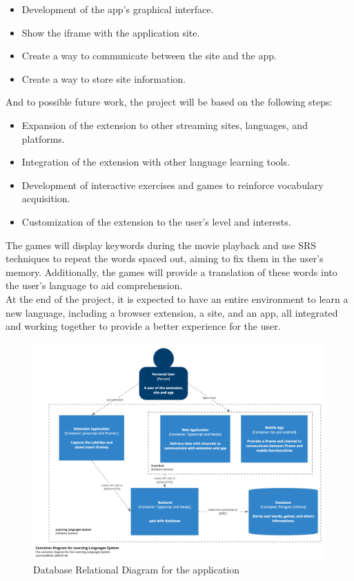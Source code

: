 \documentclass[12pt]{article}
\begin{document}
\begin{itemize}
\item Development of the app's graphical interface.
\item Show the iframe with the application site.
\item Create a way to communicate between the site and the app.
\item Create a way to store site information.
\end{itemize}
And to possible future work, the project will be based on the following steps:
\begin{itemize}
\item Expansion of the extension to other streaming sites, languages, and platforms.
\item Integration of the extension with other language learning tools.
\item Development of interactive exercises and games to reinforce vocabulary acquisition.
\item Customization of the extension to the user's level and interests.
\end{itemize}
The games will display keywords during the movie playback and use SRS techniques to repeat the words spaced out, aiming to fix them in the user's memory. Additionally, the games will provide a translation of these words into the user's language to aid comprehension. \\
At the end of the project, it is expected to have an entire environment to learn a new language, including a browser extension, a site, and an app, all integrated and working together to provide a better experience for the user. \\

\begin{figure}[h]
  \centering
  \caption{
  Database Relational Diagram for the application
  }
  \label{fig:container_diagram}
  \includegraphics[width=1\textwidth]{assets/24.png}
\end{figure}
\end{document}

